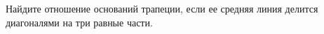 \begin{ex}
	\begin{condition}
		Найдите отношение оснований трапеции, если ее средняя линия делится диагоналями на три равные части.
	\end{condition}
\end{ex}